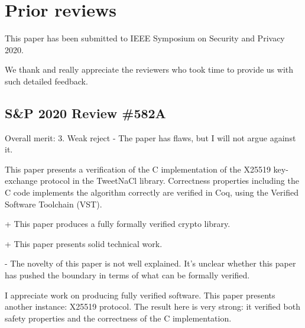 \newpage
\section{Prior reviews}
\label{appendix:past-reviews}

This paper has been submitted to IEEE Symposium on Security and Privacy 2020.

We thank and really appreciate the reviewers who took time to provide us with
such detailed feedback.

\subsection{S\&P 2020 Review \#582A}

Overall merit: 3. Weak reject - The paper has flaws, but I will not argue against it.


\begin{center}
\end{center}

This paper presents a verification of the C implementation of the X25519
key-exchange protocol in the TweetNaCl library.  Correctness properties
including the C code implements the algorithm correctly are verified in Coq,
using the Verified Software Toolchain (VST).


\begin{center}
\end{center}

+ This paper produces a fully formally verified crypto library.

+ This paper presents solid technical work.


\begin{center}
\end{center}

- The novelty of this paper is not well explained. It's unclear whether this
paper has pushed the boundary in terms of what can be formally verified.


\begin{center}
\end{center}

I appreciate work on producing fully verified software. This paper presents
another instance: X25519 protocol. The result here is very strong: it verified
both safety properties and the correctness of the C implementation.

